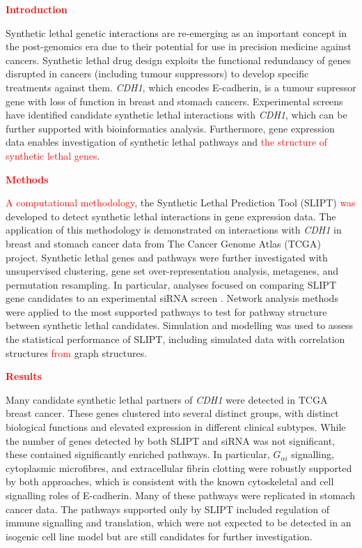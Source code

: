 \textbf{\textcolor{red}{Introduction}}

Synthetic lethal genetic interactions are re-emerging as an important concept in the post-genomics era due to their potential for use in precision medicine against cancers. Synthetic lethal drug design exploits the functional redundancy of genes disrupted in cancers (including tumour suppressors) to develop specific treatments against them. \textit{CDH1}, which encodes \gls{E-cadherin}, is a tumour supressor gene with loss of function in breast and stomach cancers. Experimental screens have identified candidate synthetic lethal interactions with \textit{CDH1}, which can be further supported with bioinformatics analysis. Furthermore, gene expression data enables investigation of synthetic lethal pathways and \textcolor{red}{the structure of synthetic lethal genes}. 

\textbf{\textcolor{red}{Methods}}

\textcolor{red}{A computational methodology}, the Synthetic Lethal Prediction Tool (\acrshort{SLIPT}) \textcolor{red}{was} developed to detect synthetic lethal interactions in gene expression data. The application of this methodology is demonstrated on interactions with \textit{CDH1} in breast and stomach cancer data from The Cancer Genome Atlas (\acrshort{TCGA}) project. Synthetic lethal genes and pathways were further investigated with unsupervised clustering, gene set over-representation analysis, metagenes, and permutation resampling. In particular, analyses focused on comparing \acrshort{SLIPT} gene candidates to an experimental \acrfull{siRNA} screen \citep{Telford2015}. Network analysis methods were applied to the most supported pathways to test for pathway structure between synthetic lethal candidates. Simulation and modelling was used to assess the statistical performance of \acrshort{SLIPT}, including simulated data with correlation structures \textcolor{red}{from} graph structures.

\textbf{\textcolor{red}{Results}}

Many candidate synthetic lethal partners of \textit{CDH1} were detected in \acrshort{TCGA} breast cancer. These genes clustered into several distinct groups, with distinct biological functions and elevated expression in different clinical subtypes. While the number of genes detected by both \acrshort{SLIPT} and \acrshort{siRNA} was not significant, these contained significantly enriched pathways. In particular, $G_{\alpha i}$ signalling, cytoplasmic microfibres, and extracellular fibrin clotting were robustly supported by both approaches, which is consistent with the known cytoskeletal and cell signalling roles of \gls{E-cadherin}. Many of these pathways were replicated in stomach cancer data. The pathways supported only by \acrshort{SLIPT} included regulation of immune signalling and translation, which were not expected to be detected in an isogenic cell line model but are still candidates for further investigation. 

